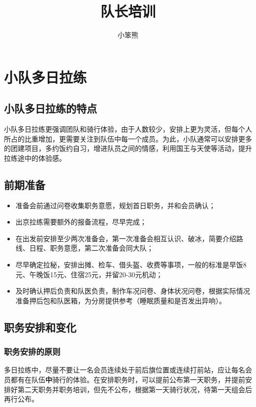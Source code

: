 \documentclass[UTF8]{ctexart}
\title{队长培训}
\author{小笨熊}
\begin{document}
\maketitle

\tableofcontents

\clearpage
\section{小队多日拉练}

\subsection{小队多日拉练的特点}

小队多日拉练更强调团队和骑行体验，由于人数较少，安排上更为灵活，但每个人所占的比重增加，更需要关注到队伍中每一个成员。为此，小队通常可以安排更多的团建项目，多约饭约自习，增进队员之间的情感，利用国王与天使等活动，提升拉练途中的体验感。

\subsection{前期准备}

\begin{itemize}[nosep,left=2em]
    \item 准备会前通过问卷收集职务意愿，规划首日职务，并和会员确认；
    \item 出京拉练需要额外的报备流程，尽早完成；
    \item 在出发前安排至少两次准备会，第一次准备会相互认识、破冰，简要介绍路线、日程、职务意愿，第二次准备会同大队；
    \item 尽早确定拉秘，安排出摊、检车、借头盔、收费等事项，一般的标准是早饭8元、午晚饭15元、住宿25元，并留20-30元机动；
    \item 及时确认押后负责和队医负责，制作车况问卷、身体状况问卷，根据实际情况准备押后包和队医箱，为分房提供参考（睡眠质量和是否发出异响）。
\end{itemize}

\subsection{职务安排和变化}

\subsubsection{职务安排的原则}

多日拉练中，尽量不要让一名会员连续处于前后旗位置或连续打前站，应让每名会员都有在队伍\textbf{中}骑行的体验。在安排职务时，可以提前公布第一天职务，并提前安排好第二天职务并职务培训，但先不公布，根据第一天骑行状况，待第一天组会后再行公布。
\end{document}
